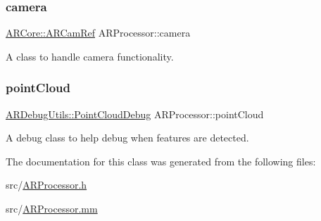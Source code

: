 \subsubsection{\texorpdfstring{camera}{camera}}
{\footnotesize\ttfamily \hyperlink{namespace_a_r_core_a4ebe9e23907235fcf76bf65440fde0e0}{A\+R\+Core\+::\+A\+R\+Cam\+Ref} A\+R\+Processor\+::camera}



A class to handle camera functionality. 

\mbox{\label{class_a_r_processor_a555e829fbf6b625537f6fd7cd9557002}} 
\subsubsection{\texorpdfstring{point\+Cloud}{pointCloud}}
{\footnotesize\ttfamily \hyperlink{class_a_r_debug_utils_1_1_point_cloud_debug}{A\+R\+Debug\+Utils\+::\+Point\+Cloud\+Debug} A\+R\+Processor\+::point\+Cloud}



A debug class to help debug when features are detected. 



The documentation for this class was generated from the following files\+:\begin{DoxyCompactItemize}
\item 
src/\hyperlink{_a_r_processor_8h}{A\+R\+Processor.\+h}\item 
src/\hyperlink{_a_r_processor_8mm}{A\+R\+Processor.\+mm}\end{DoxyCompactItemize}
